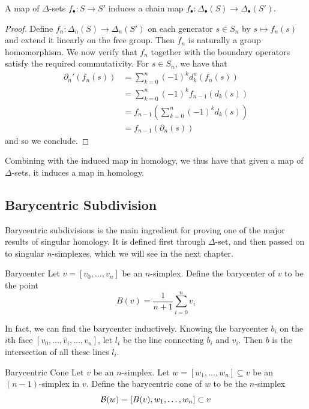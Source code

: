 \documentclass[a4paper]{article}
\begin{document}
\begin{lmm}{}{} A map of $\Delta$-sets $f_\bullet:S\to S'$ induces a chain map $f_\bullet:\Delta_\bullet(S)\to\Delta_\bullet(S')$. \tcbline
\begin{proof}
Define $f_n:\Delta_n(S)\to\Delta_n(S')$ on each generator $s\in S_n$ by $s\mapsto f_n(s)$ and extend it linearly on the free group. Then $f_n$ is naturally a group homomorphism. We now verify that $f_n$ together with the boundary operators satisfy the required commutativity. For $s\in S_n$, we have that 
\begin{align*}
\partial_n'(f_n(s))&=\sum_{k=0}^n(-1)^kd_k^n(f_n(s))\\
&=\sum_{k=0}^n(-1)^kf_{n-1}(d_k(s))\\
&=f_{n-1}\left(\sum_{k=0}^n(-1)^kd_k(s)\right)\\
&=f_{n-1}(\partial_n(s))
\end{align*}
and so we conclude. 
\end{proof}
\end{lmm}

Combining with the induced map in homology, we thus have that given a map of $\Delta$-sets, it induces a map in homology. 

\subsection{Barycentric Subdivision}
Barycentric subdivisions is the main ingredient for proving one of the major results of singular homology. It is defined first through $\Delta$-set, and then passed on to singular $n$-simplexes, which we will see in the next chapter. 

\begin{defn}{Barycenter}{} Let $v=[v_0,\dots,v_n]$ be an $n$-simplex. Define the barycenter of $v$ to be the point $$B(v)=\frac{1}{n+1}\sum_{i=0}^nv_i$$
\end{defn}

In fact, we can find the barycenter inductively. Knowing the barycenter $b_i$ on the $i$th face $[v_0,\dots,\hat{v}_i,\dots,v_n]$, let $l_i$ be the line connecting $b_i$ and $v_i$. Then $b$ is the intersection of all these lines $l_i$. 

\begin{defn}{Barycentric Cone}{} Let $v$ be an $n$-simplex. Let $w=[w_1,\dots,w_n]\subseteq v$ be an $(n-1)$-simplex in $v$. Define the barycentric cone of $w$ to be the $n$-simplex $$\mathcal{B}(w)=[B(v),w_1,\dots,w_n]\subset v$$ 
\end{defn}
\end{document}
